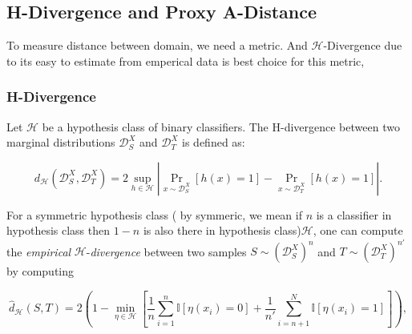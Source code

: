 \documentclass{article}
\begin{document}


\subsection{H-Divergence and Proxy A-Distance}

To measure distance between domain, we need a metric. And $\mathcal{H}$-Divergence due to its easy to estimate from emperical data is best choice for this metric,

\subsubsection{H-Divergence}

Let \( \mathcal{H} \) be a hypothesis class of binary classifiers. The H-divergence between two marginal distributions \( \mathcal{D}_S^X \) and \( \mathcal{D}_T^X \) is defined as:

\begin{equation}
d_{\mathcal{H}}(\mathcal{D}_S^X, \mathcal{D}_T^X) = 2 \sup_{h \in \mathcal{H}} \left| \Pr_{x \sim \mathcal{D}_S^X}[h(x) = 1] - \Pr_{x \sim \mathcal{D}_T^X}[h(x) = 1] \right|.
\end{equation}

For a symmetric hypothesis class ( by symmeric, we mean if $n$ is a classifier in hypothesis class then $1 - n$ is also there in hypothesis class)$\mathcal{H}$, one can compute the \textit{empirical} $\mathcal{H}$-\textit{divergence} between two samples $S \sim (\mathcal{D}_S^X)^n$ and $T \sim (\mathcal{D}_T^X)^{n'}$ by computing

\begin{equation}
\hat{d}_{\mathcal{H}}(S, T) = 2 \left( 1 - \min_{\eta \in \mathcal{H}} \left[ \frac{1}{n} \sum_{i=1}^{n} \mathbb{I}\left[\eta(x_i) = 0\right] + \frac{1}{n'} \sum_{i=n+1}^{N} \mathbb{I}\left[\eta(x_i) = 1\right] \right] \right),
\end{equation}
\end{document}
